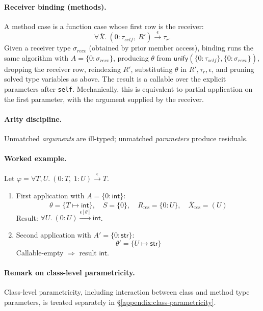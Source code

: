 \paragraph{Receiver binding (methods).}
A method case is a function case whose first row is the receiver:
\[
\forall \overline{X}.~(0:\tau_{\mathit{self}},~R') \xrightarrow{\epsilon} \tau_r.
\]
Given a receiver type $\sigma_{\mathit{recv}}$ (obtained by prior member access),
binding runs the same algorithm with $A=\{0:\sigma_{\mathit{recv}}\}$, producing
$\theta$ from $\mathsf{unify}(\{0:\tau_{\mathit{self}}\},\{0:\sigma_{\mathit{recv}}\})$,
dropping the receiver row, reindexing $R'$, substituting $\theta$ in $R',\tau_r,\epsilon$,
and pruning solved type variables as above. The result is a callable over the explicit
parameters after \texttt{self}. Mechanically, this is equivalent to partial application
on the first parameter, with the argument supplied by the receiver.

\paragraph{Arity discipline.}
Unmatched \emph{arguments} are ill-typed; unmatched \emph{parameters} produce residuals.

\paragraph{Worked example.}
Let $\varphi = \forall T,U.~(0:T,\;1:U) \xrightarrow{\epsilon} T$.
\begin{enumerate}
  \item First application with $A=\{0:\mathsf{int}\}$:
  \[
    \theta=\{T\mapsto \mathsf{int}\},\quad S=\{0\},\quad
    R_{\mathrm{res}} = \{0:U\},\quad
    \overline{X}_{\mathrm{res}}=(U)
  \]
  Result: $\forall U.~(0:U)\xrightarrow{\epsilon[\theta]} \mathsf{int}$.
  \item Second application with $A'=\{0:\mathsf{str}\}$:
  \[
    \theta'=\{U\mapsto \mathsf{str}\}
  \]
  Callable-empty $\Rightarrow$ result $\mathsf{int}$.
\end{enumerate}

\paragraph{Remark on class-level parametricity.}
Class-level parametricity, including interaction between class and method type parameters,
is treated separately in \S\ref{appendix:class-parametricity}.


